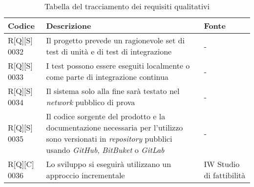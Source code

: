 \begin{center}
    \begin{longtable}{|p{2cm}|p{9cm}|p{2cm}|}%
    \caption{Tabella del tracciamento dei requisiti qualitativi}
    \label{tab:requisiti-qualitativi}
    \endfirsthead
    \endhead
    \hline
    \textbf{Codice} & \textbf{Descrizione} & \textbf{Fonte}\\
    \hline
    R[Q][S] 0032    & Il progetto prevede un ragionevole set di test di unità e di test di integrazione & - \\
    \hline
    R[Q][S] 0033   & I test possono essere eseguiti localmente o come parte di integrazione continua & - \\
    \hline
    R[Q][S] 0034    & Il sistema solo alla fine sarà testato nel \textit{network} pubblico di prova & - \\
    \hline
    R[Q][S] 0035    & Il codice sorgente del prodotto e la documentazione necessaria per l’utilizzo sono versionati in \textit{repository} pubblici usando \textit{GitHub}, \textit{BitBuket} o \textit{GitLab} & - \\
    \hline
    R[Q][C] 0036    & Lo sviluppo si eseguirà utilizzano un approccio incrementale  & IW Studio di fattibilità \\
    \hline
    \end{longtable}
    \end{center}%


